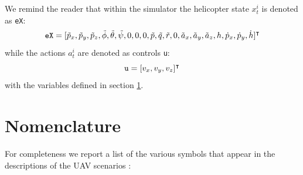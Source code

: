 \documentclass[a4paper,11pt]{report}
\newcommand\mytexttt[1]{\texttt{\hyphenchar\font=45\relax #1}}
\begin{document}
We remind the reader that within the simulator the helicopter state $x^i_t$ is denoted as \mytexttt{eX}:
$$\mytexttt{eX} = [\tilde{p}_x,\tilde{p}_y,\tilde{p}_z,\tilde{\phi},\tilde{\theta},\tilde{\psi},0,0,0,\tilde{p},\tilde{q},\tilde{r},0,\tilde{a}_x,\tilde{a}_y,\tilde{a}_z,h,\dot{p}_x,\dot{p}_y,\dot{h}]^\intercal$$
while the actions $a^i_t$ are denoted as controls \mytexttt{u}:
$$\mytexttt{u}=[v_x,v_y,v_z]^\intercal$$
with the variables defined in section \ref{tab:naming}.

\newpage


\section{Nomenclature}\label{tab:naming}

For completeness we report a list of the various symbols that appear in the descriptions of the UAV scenarios :
\end{document}
